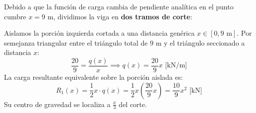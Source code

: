
Debido a que la función de carga cambia de pendiente analítica en el punto cumbre $x = 9\text{ m}$, dividimos la viga en \textbf{dos tramos de corte}:


Aislamos la porción izquierda cortada a una distancia genérica $x \in [0, 9\text{ m}]$. Por semejanza triangular entre el triángulo total de $9\text{ m}$ y el triángulo seccionado a distancia $x$:
\begin{equation}
    \frac{20}{9} = \frac{q(x)}{x} \implies \boxed{q(x) = \frac{20}{9}x\text{ [kN/m]}}
\end{equation}
La carga resultante equivalente sobre la porción aislada es:
\begin{equation}
    R_1(x) = \frac{1}{2} x \cdot q(x) = \frac{1}{2} x \left(\frac{20}{9}x\right) = \frac{10}{9}x^2\text{ [kN]}
\end{equation}
Su centro de gravedad se localiza a $\frac{x}{3}$ del corte.

